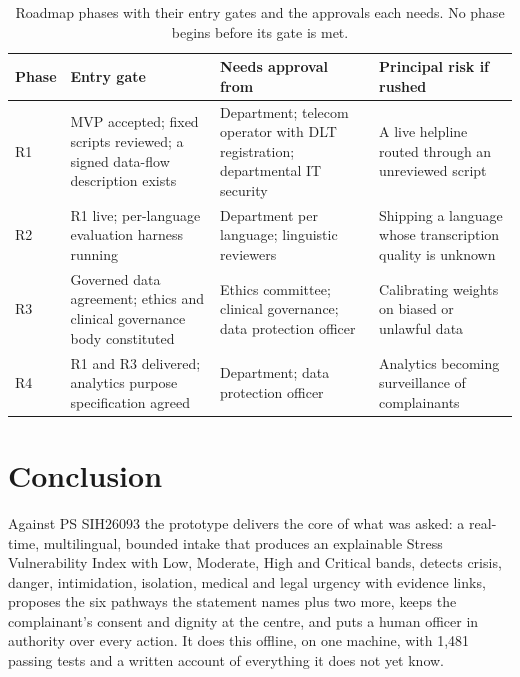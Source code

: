 \documentclass[11pt,a4paper]{article}
\begin{document}
\begin{table}[!htbp]
\centering\footnotesize
\caption{Roadmap phases with their entry gates and the approvals each needs. No phase begins before
its gate is met.}
\label{tab:roadmapgates}
\begin{tabularx}{\linewidth}{@{}>{\raggedright\arraybackslash}p{1.2cm}>{\raggedright\arraybackslash}p{4.2cm}>{\raggedright\arraybackslash}p{4.4cm}X@{}}
\toprule
Phase & Entry gate & Needs approval from & Principal risk if rushed \\
\midrule
R1 & MVP accepted; fixed scripts reviewed; a signed data-flow description exists & Department;
telecom operator with DLT registration; departmental IT security & A live helpline routed through an
unreviewed script \\
R2 & R1 live; per-language evaluation harness running & Department per language; linguistic reviewers
& Shipping a language whose transcription quality is unknown \\
R3 & Governed data agreement; ethics and clinical governance body constituted & Ethics committee;
clinical governance; data protection officer & Calibrating weights on biased or unlawful data \\
R4 & R1 and R3 delivered; analytics purpose specification agreed & Department; data protection officer
& Analytics becoming surveillance of complainants \\
\bottomrule
\end{tabularx}
\end{table}

\section{Conclusion}

Against PS SIH26093 the prototype delivers the core of what was asked: a real-time, multilingual,
bounded intake that produces an explainable Stress Vulnerability Index with Low, Moderate, High and
Critical bands, detects crisis, danger, intimidation, isolation, medical and legal urgency with
evidence links, proposes the six pathways the statement names plus two more, keeps the complainant's
consent and dignity at the centre, and puts a human officer in authority over every action. It does
this offline, on one machine, with 1{,}481 passing tests and a written account of everything it does
not yet know.
\end{document}

